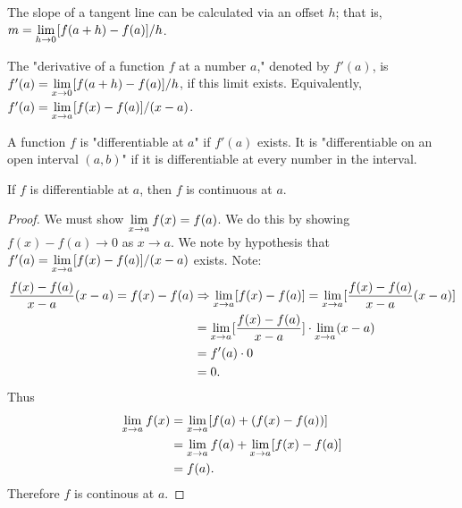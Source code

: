 \documentclass[a4paper,11pt]{article}
\begin{document}
\begin{outline}
    The slope of a tangent line can be calculated via an offset \(h\); that is, \(m = \lim\limits_{h\rightarrow 0^{}}
    [f(a+h)-f(a)]/h\).
    
    The "derivative of a function \(f\) at a number \(a\)," denoted by \(f'(a)\), is \(f'(a) = \lim\limits_{x\rightarrow 0^{}}
    [f(a+h)-f(a)]/h\), if this limit exists. Equivalently, \(f'(a) = \lim\limits_{x\rightarrow a^{}} [f(x)-f(a)]/(x-a)\).
    
    A function \(f\) is "differentiable at \(a\)" if \(f'(a)\) exists. It is "differentiable on an open
    interval \((a, b)\)" if it is differentiable at every number in the interval.
    
    If \(f\) is differentiable at \(a\), then \(f\) is continuous at \(a\).
    
    \begin{proof}
      We must show \(\lim\limits_{x\rightarrow a^{}} f(x) = f(a)\). We do this by showing \(f(x)-f(a)\rightarrow 0\) as 
      \(x \rightarrow a\). We note by hypothesis that \(f'(a) = \lim\limits_{x\rightarrow a^{}} [f(x)-f(a)]/(x-a)\) exists.
      Note:
      \begin{align*}
        \frac{f(x)-f(a)}{x-a}(x-a) = f(x)-f(a) 
          &\Rightarrow \lim\limits_{x\rightarrow a^{}} [f(x)-f(a)] = \lim\limits_{x\rightarrow a^{}} [\frac{f(x)-f(a)}{x-a}(x-a)]\\
          &= \lim\limits_{x\rightarrow a^{}}[\frac{f(x)-f(a)}{x-a}] \cdot \lim\limits_{x\rightarrow a^{}} (x-a)\\
          &= f'(a) \cdot 0\\
          &= 0\text{.}
      \end{align*}
      Thus 
      \begin{align*}
        \lim\limits_{x\rightarrow a^{}} f(x) &= \lim\limits_{x\rightarrow a^{}}[f(a) + (f(x)-f(a))]\\
                           &= \lim\limits_{x\rightarrow a^{}}f(a) + \lim\limits_{x\rightarrow a^{}}[f(x)-f(a)]\\
                           &= f(a)\text{.}
      \end{align*}
      Therefore \(f\) is continous at \(a\).
    \end{proof}

\end{outline}
\end{document}
